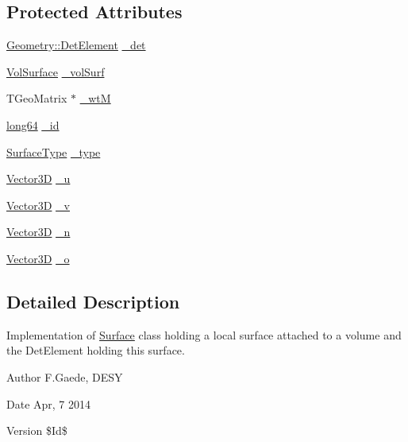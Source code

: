 \subsection*{Protected Attributes}
\begin{DoxyCompactItemize}
\item 
\hyperlink{class_d_d4hep_1_1_geometry_1_1_det_element}{Geometry\+::\+Det\+Element} \hyperlink{class_d_d4hep_1_1_d_d_rec_1_1_surface_a41a9849864ae0888964242798aaaa8e8}{\+\_\+det}
\item 
\hyperlink{class_d_d4hep_1_1_d_d_rec_1_1_vol_surface}{Vol\+Surface} \hyperlink{class_d_d4hep_1_1_d_d_rec_1_1_surface_a5555dbcfaaa833c3169aec39f447b2c3}{\+\_\+vol\+Surf}
\item 
T\+Geo\+Matrix $\ast$ \hyperlink{class_d_d4hep_1_1_d_d_rec_1_1_surface_acbbdd616ea4e084228084cd6d94dff99}{\+\_\+wtM}
\item 
\hyperlink{namespace_d_d_surfaces_ab6b3da366f31f80aec56447ac4442e78}{long64} \hyperlink{class_d_d4hep_1_1_d_d_rec_1_1_surface_a14744685350bb3023c3e2efe02f8d707}{\+\_\+id}
\item 
\hyperlink{class_d_d_surfaces_1_1_surface_type}{Surface\+Type} \hyperlink{class_d_d4hep_1_1_d_d_rec_1_1_surface_a1abb4367c088376f8607c45f9faaddb8}{\+\_\+type}
\item 
\hyperlink{class_d_d_surfaces_1_1_vector3_d}{Vector3D} \hyperlink{class_d_d4hep_1_1_d_d_rec_1_1_surface_abbf2e76e33b536bac67c387b860c1ff4}{\+\_\+u}
\item 
\hyperlink{class_d_d_surfaces_1_1_vector3_d}{Vector3D} \hyperlink{class_d_d4hep_1_1_d_d_rec_1_1_surface_a12656a8ed5ccc5a1993e1bacf9d4624b}{\+\_\+v}
\item 
\hyperlink{class_d_d_surfaces_1_1_vector3_d}{Vector3D} \hyperlink{class_d_d4hep_1_1_d_d_rec_1_1_surface_a9191ee82058481753f4d5d5234415382}{\+\_\+n}
\item 
\hyperlink{class_d_d_surfaces_1_1_vector3_d}{Vector3D} \hyperlink{class_d_d4hep_1_1_d_d_rec_1_1_surface_aab036a2e1a02dcc393f03a901fea39d4}{\+\_\+o}
\end{DoxyCompactItemize}


\subsection{Detailed Description}
Implementation of \hyperlink{class_d_d4hep_1_1_d_d_rec_1_1_surface}{Surface} class holding a local surface attached to a volume and the Det\+Element holding this surface.

\begin{DoxyAuthor}{Author}
F.\+Gaede, D\+E\+SY 
\end{DoxyAuthor}
\begin{DoxyDate}{Date}
Apr, 7 2014 
\end{DoxyDate}
\begin{DoxyVersion}{Version}
\$\+Id\$ 
\end{DoxyVersion}


